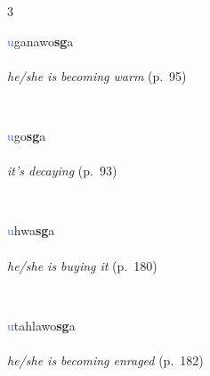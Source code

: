 \documentclass[oneside,openany]{book}%
\begin{document}
\begin{multicols}{3}
\begin{minipage}[t]{\linewidth}
\raggedright\noindent \textcolor{RoyalBlue}{u}ganawo\textbf{sg}a\\
\\
\noindent \textit{he/she is becoming warm} (p.~95)
\end{minipage}\\[1em]%
\begin{minipage}[t]{\linewidth}
\raggedright\noindent \textcolor{RoyalBlue}{u}go\textbf{sg}a\\
\\
\noindent \textit{it's decaying} (p.~93)
\end{minipage}\\[1em]%
\begin{minipage}[t]{\linewidth}
\raggedright\noindent \textcolor{RoyalBlue}{u}hwa\textbf{sg}a\\
\\
\noindent \textit{he/she is buying it} (p.~180)
\end{minipage}\\[1em]%
\begin{minipage}[t]{\linewidth}
\raggedright\noindent \textcolor{RoyalBlue}{u}tahlawo\textbf{sg}a\\
\\
\noindent \textit{he/she is becoming enraged} (p.~182)
\end{minipage}\\[1em]%
\end{multicols}%
\vspace{1em}%
\needspace{1.5in}%
\end{document}
